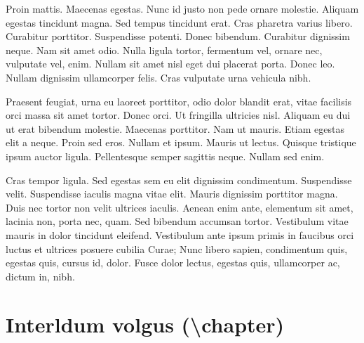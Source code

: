 \documentclass[nochapterpage,bigchapter,linedtoc,longdoc,colorback,accentcolor=tud3a]{tudreport}
\begin{document}
    Proin mattis. Maecenas egestas. Nunc id justo non pede ornare molestie. Aliquam egestas tincidunt magna. Sed tempus tincidunt erat. Cras pharetra varius libero. Curabitur porttitor. Suspendisse potenti. Donec bibendum. Curabitur dignissim neque. Nam sit amet odio. Nulla ligula tortor, fermentum vel, ornare nec, vulputate vel, enim. Nullam sit amet nisl eget dui placerat porta. Donec leo. Nullam dignissim ullamcorper felis. Cras vulputate urna vehicula nibh.

    Praesent feugiat, urna eu laoreet porttitor, odio dolor blandit erat, vitae facilisis orci massa sit amet tortor. Donec orci. Ut fringilla ultricies nisl. Aliquam eu dui ut erat bibendum molestie. Maecenas porttitor. Nam ut mauris. Etiam egestas elit a neque. Proin sed eros. Nullam et ipsum. Mauris ut lectus. Quisque tristique ipsum auctor ligula. Pellentesque semper sagittis neque. Nullam sed enim.

    Cras tempor ligula. Sed egestas sem eu elit dignissim condimentum. Suspendisse velit. Suspendisse iaculis magna vitae elit. Mauris dignissim porttitor magna. Duis nec tortor non velit ultrices iaculis. Aenean enim ante, elementum sit amet, lacinia non, porta nec, quam. Sed bibendum accumsan tortor. Vestibulum vitae mauris in dolor tincidunt eleifend. Vestibulum ante ipsum primis in faucibus orci luctus et ultrices posuere cubilia Curae; Nunc libero sapien, condimentum quis, egestas quis, cursus id, dolor. Fusce dolor lectus, egestas quis, ullamcorper ac, dictum in, nibh.

  \chapter{Interldum volgus (\textbackslash chapter)}
\end{document}
